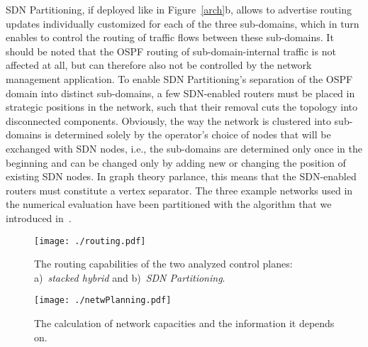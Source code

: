\documentclass[10pt, conference]{IEEEtran}
\begin{document}
SDN Partitioning, if deployed like in Figure~\ref{arch}b, allows to advertise routing updates individually customized for each of the three sub-domains, which in turn enables to control the routing of traffic flows between these sub-domains. It should be noted that the OSPF routing of sub-domain-internal traffic is not affected at all, but can therefore also not be controlled by the network management application. To enable SDN Partitioning's separation of the OSPF domain into distinct sub-domains, a few SDN-enabled routers must be placed in strategic positions in the network, such that their removal cuts the topology into disconnected components. Obviously, the way the network is clustered into sub-domains is determined solely by the operator's choice of nodes that will be exchanged with SDN nodes, i.e., the sub-domains are determined only once in the beginning and can be changed only by adding new or changing the position of existing SDN nodes. In graph theory parlance, this means that the SDN-enabled routers must constitute a vertex separator. The three example networks used in the numerical evaluation have been partitioned with the algorithm that we introduced in~\cite{caria_TNSM}.
















\begin{figure*}[t] \center
\texttt{[image: ./routing.pdf]}
\caption{The routing capabilities of the two analyzed control planes: a)~\emph{stacked hybrid} and b)~\emph{SDN Partitioning}.}
\label{routing} \end{figure*}



\begin{figure}[t] \center
\texttt{[image: ./netwPlanning.pdf]}
\caption{The calculation of network capacities and the information it depends on.}
\label{netwPlanning} \end{figure}
\end{document}
